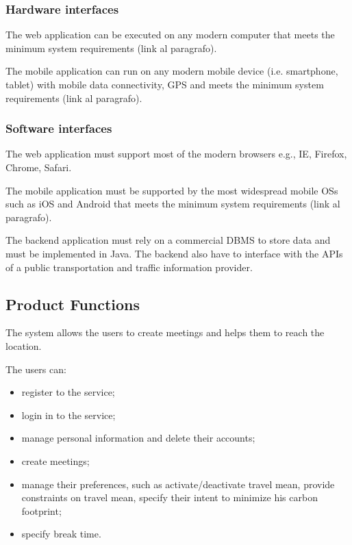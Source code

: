 \documentclass{article}
\begin{document}
	\subsubsection{Hardware interfaces}
	The web application can be executed on any modern computer that meets the minimum system requirements (link al paragrafo).
	
	\bigskip
	The mobile application can run on any modern mobile device (i.e. smartphone, tablet) with mobile data connectivity,  GPS and meets the minimum system requirements (link al paragrafo).


	\subsubsection{Software interfaces}
	The web application must support most of the modern browsers e.g., IE, Firefox, Chrome, Safari.
	
	\bigskip
	The mobile application must be supported by the most widespread mobile OSs such as iOS and Android that meets the minimum system requirements (link al paragrafo).

	\bigskip
	The backend application must rely on a commercial DBMS to store data and must be implemented in Java.
	The backend also have to interface with the APIs of a public transportation and  traffic information provider.
	
	
	\subsection{Product Functions}
	The system allows the users to create meetings and helps them to reach the location.
	
	The users can:
	\begin{itemize}
		\item register to the service;
		\item login in to the service;
		\item manage personal information and delete their accounts;
		\item create meetings;
		\item manage their preferences, such as activate/deactivate travel mean, provide constraints on travel mean, specify their intent to minimize his carbon footprint;
		\item specify break time.
	\end{itemize}
	
\end{document}
